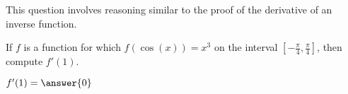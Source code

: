 \documentclass{ximera}
\author{Steven Gubkin}
\begin{document}
\begin{exercise}



This question involves reasoning similar to the proof of the derivative of an inverse function.

If $f$ is a function for which $f(\cos(x)) = x^3$ on the interval $[-\frac{\pi}{4},\frac{\pi}{4}]$, then compute $f'(1)$.

$f'(1) = \answer{0}$

\end{exercise}
\end{document}
